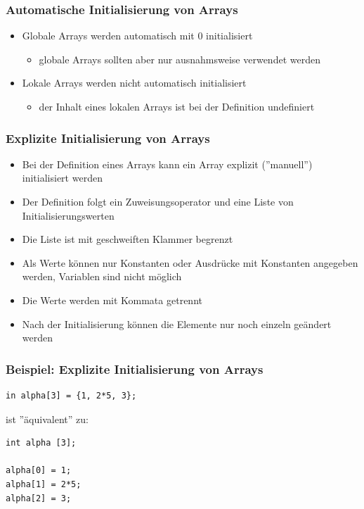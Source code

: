 \subsubsection{Automatische Initialisierung von Arrays}
\label{sec:Automatische Initialisierung von Arrays}
\begin{itemize}
	\item Globale Arrays werden automatisch mit 0 initialisiert
	\begin{itemize}
		\item globale Arrays sollten aber nur ausnahmsweise verwendet werden
	\end{itemize}
	\item Lokale Arrays werden nicht automatisch initialisiert
	\begin{itemize}
		\item der Inhalt eines lokalen Arrays ist bei der Definition undefiniert
	\end{itemize}
\end{itemize}

\subsubsection{Explizite Initialisierung von Arrays}
\label{sec:Explizite Initialisierung von Arrays}
\begin{itemize}
	\item Bei der Definition eines Arrays kann ein Array explizit (''manuell'') initialisiert werden
	\item Der Definition folgt ein Zuweisungsoperator und eine Liste von Initialisierungswerten
	\item Die Liste ist mit geschweiften Klammer begrenzt
	\item Als Werte können nur Konstanten oder Ausdrücke mit Konstanten angegeben werden, \color{red}Variablen sind nicht möglich\color{black}
	\item Die Werte werden mit Kommata getrennt
	\item Nach der Initialisierung können die Elemente nur noch einzeln geändert werden
\end{itemize}

\subsubsection{Beispiel: Explizite Initialisierung von Arrays}
\label{sec:Beispiel: Explizite Initialisierung von Arrays}
\noindent
\begin{minipage}{\linewidth}
\begin{lstlisting}
in alpha[3] = {1, 2*5, 3};
\end{lstlisting}
\end{minipage}
ist ''äquivalent'' zu:
\noindent
\begin{minipage}{\linewidth}
\begin{lstlisting}
int alpha [3];

alpha[0] = 1;
alpha[1] = 2*5;
alpha[2] = 3;
\end{lstlisting}
\end{minipage}

